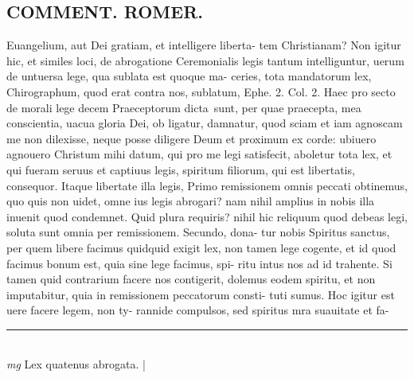 \documentclass{article}
\begin{document}
\begin{pages}
\section*{COMMENT. ROMER.  }\pstart Euangelium, aut Dei gratiam, et intelligere liberta- tem Christianam? Non igitur hic, et similes loci, de abrogatione Ceremonialis legis tantum intelliguntur, uerum de untuersa lege, qua sublata est quoque ma- ceries, tota mandatorum lex, Chirographum, quod erat contra nos, sublatum, Ephe. 2. Col. 2. Haec pro secto de morali lege decem Praeceptorum dicta sunt, per quae praecepta, mea conscientia, uacua gloria Dei, ob ligatur, damnatur, quod sciam et iam agnoscam me non dilexisse, neque posse diligere Deum et proximum ex corde: ubiuero agnouero Christum mihi datum, qui pro me legi satisfecit, aboletur tota lex, et qui fueram seruus et captiuus legis, spiritum filiorum, qui est libertatis, consequor. Itaque libertate illa legis, Primo remissionem omnis peccati obtinemus, quo quis non uidet, omne ius legis abrogari? nam nihil amplius in nobis illa inuenit quod condemnet. Quid plura requiris? nihil hic reliquum quod debeas legi, soluta sunt omnia per remissionem. Secundo, dona- tur nobis Spiritus sanctus, per quem libere facimus quidquid exigit lex, non tamen lege cogente, et id quod facimus bonum est, quia sine lege facimus, spi- ritu intus nos ad id trahente. Si tamen quid contrarium facere nos contigerit, dolemus eodem spiritu, et non imputabitur, quia in remissionem peccatorum consti- tuti sumus. Hoc igitur est uere facere legem, non ty- rannide compulsos, sed spiritus mra suauitate et fa-  \pend
\vspace{0.5cm}\noindent
\vspace{0.2cm}\rule{1cm}{0.2pt}\\ 
\hspace{0.2cm}\textit{mg}
\footnotesize Lex quatenus abrogata.  
\normalsize| 

\end{pages}
\end{document}
